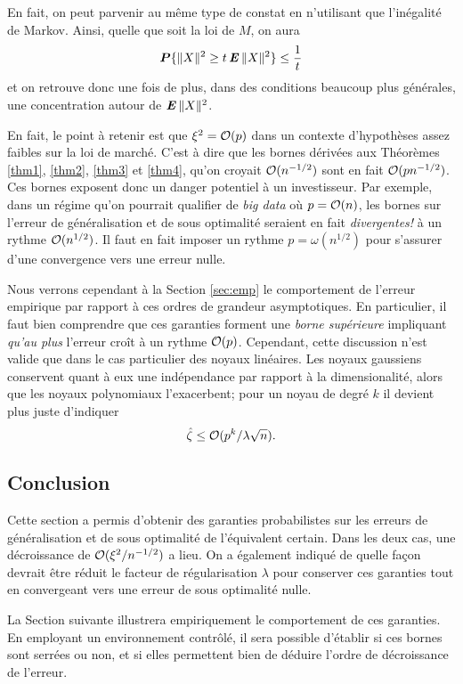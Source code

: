 En fait, on peut parvenir au même type de constat en n'utilisant que l'inégalité de
Markov. Ainsi, quelle que soit la loi de $M$, on aura
\begin{equation}
  \bm P\{\|X\|^2 \ge t\operatorname{\mbox{\textbf{\textit{E}}}}\|X\|^2\} \leq \frac{1}{t}
\end{equation}
et on retrouve donc une fois de plus, dans des conditions beaucoup plus générales, une
concentration autour de $\operatorname{\mbox{\textbf{\textit{E}}}}\|X\|^2$. 

En fait, le point à retenir est que $\xi^2 = \mathcal O(p)$ dans un contexte d'hypothèses assez
faibles sur la loi de marché. C'est à dire que les bornes dérivées aux Théorèmes
\ref{thm1}, \ref{thm2}, \ref{thm3} et \ref{thm4}, qu'on croyait
$\mathcal O(n^{-1/2})$ sont en fait $\mathcal O(pn^{-1/2})$. Ces bornes exposent donc un
danger potentiel à un investisseur. Par exemple, dans un régime qu'on pourrait qualifier
de \textit{big data} où $p=\mathcal O(n)$, les bornes sur l'erreur de généralisation et de sous
optimalité seraient en fait \textit{divergentes!} à un rythme $\mathcal O(n^{1/2})$. Il faut en
fait imposer un rythme $p = \omega(n^{1/2})$ pour s'assurer d'une convergence vers une erreur
nulle.

Nous verrons cependant à la Section \ref{sec:emp} le comportement de l'erreur empirique
par rapport à ces ordres de grandeur asymptotiques. En particulier, il faut bien
comprendre que ces garanties forment une \textit{borne supérieure} impliquant \textit{qu'au plus}
l'erreur croît à un rythme $\mathcal O(p)$. 
Cependant, cette discussion n'est valide que dans le cas particulier des noyaux
linéaires. Les noyaux gaussiens conservent quant à eux une indépendance par rapport à la
dimensionalité, alors que les noyaux polynomiaux l'exacerbent; pour un noyau de degré $k$
il devient plus juste d'indiquer
\begin{equation}
  \hat\zeta \leq \mathcal O(p^k/\lambda\sqrt{n}).
\end{equation}

\subsection{Conclusion}

Cette section a permis d'obtenir des garanties probabilistes sur les erreurs de
généralisation et de sous optimalité de l'équivalent certain. Dans les deux cas, une
décroissance de $\mathcal O(\xi^2/n^{-1/2})$ a lieu. On a également indiqué de quelle façon
devrait être réduit le facteur de régularisation $\lambda$ pour conserver ces garanties tout en
convergeant vers une erreur de sous optimalité nulle.

La Section suivante illustrera empiriquement le comportement de ces garanties. En
employant un environnement contrôlé, il sera possible d'établir si ces bornes sont serrées
ou non, et si elles permettent bien de déduire l'ordre de décroissance de l'erreur. 






